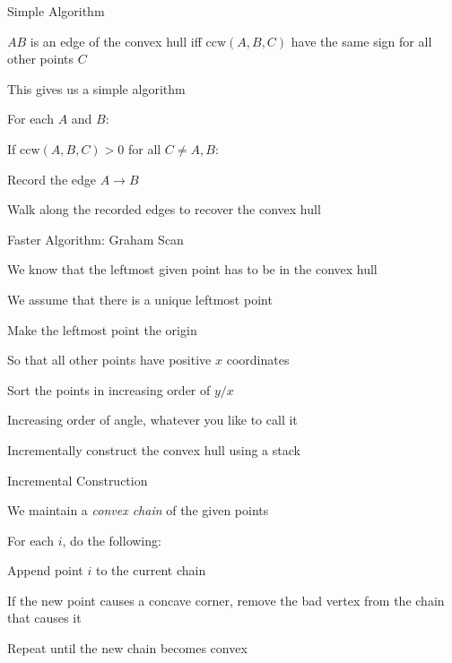 \documentclass[13pt,onlymath]{beamer}
\begin{document}
\begin{frame}{Simple Algorithm}
\BIT
\item $AB$ is an edge of the convex hull iff $\mathrm{ccw}(A, B, C)$ have the same sign for all other points $C$
\BIT
\item This gives us a simple algorithm
\EIT
\vfill
\item For each $A$ and $B$:
\BIT
\item If $\mathrm{ccw}(A, B, C) > 0$ for all $C \ne A, B$:
\BIT
\item Record the edge $A \rightarrow B$
\EIT\EIT
\item Walk along the recorded edges to recover the convex hull
\EIT
\end{frame}

\begin{frame}{Faster Algorithm: Graham Scan}
\BIT
\item We know that the leftmost given point has to be in the convex hull
\BIT
\item We assume that there is a unique leftmost point
\EIT
\item Make the leftmost point the origin
\BIT
\item So that all other points have positive $x$ coordinates
\EIT
\item Sort the points in increasing order of $y/x$
\BIT
\item Increasing order of angle, whatever you like to call it
\EIT
\item Incrementally construct the convex hull using a stack
\EIT
\end{frame}

\begin{frame}{Incremental Construction}
\BIT
\item We maintain a \emph{convex chain} of the given points
\item For each $i$, do the following:
\BIT
\item Append point $i$ to the current chain
\item If the new point causes a concave corner, remove the bad vertex from the chain that causes it
\item Repeat until the new chain becomes convex
\EIT\EIT
\end{frame}
\end{document}
